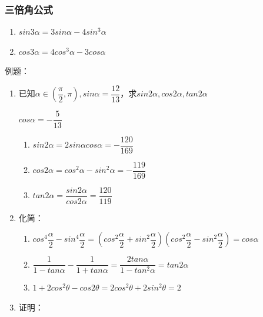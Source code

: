 \subsubsection*{三倍角公式}
\begin{enumerate}
    \item $sin3\alpha = 3sin\alpha - 4sin^3\alpha$
    \item $cos3\alpha = 4cos^3\alpha - 3cos\alpha$
\end{enumerate}
例题：
\begin{enumerate}
    \item 已知$\alpha \in (\dfrac{\pi}{2}, \pi), sin\alpha = \dfrac{12}{13}$，求$sin2\alpha, cos2\alpha, tan2\alpha$
    \begin{jieda}
        $cos\alpha = -\dfrac{5}{13}$
        \begin{enumerate}
            \item $sin2\alpha = 2sin\alpha cos\alpha = -\dfrac{120}{169}$
            \item $cos2\alpha = cos^2\alpha - sin^2\alpha = -\dfrac{119}{169}$
            \item $tan2\alpha = \dfrac{sin2\alpha}{cos2\alpha} = \dfrac{120}{119}$
        \end{enumerate}
    \end{jieda}
    \item 化简：
    \begin{jieda}
        \begin{enumerate}
            \item $cos^4\dfrac{\alpha}{2} - sin^4\dfrac{\alpha}{2} = \left(cos^2\dfrac{\alpha}{2} + sin^2\dfrac{\alpha}{2}\right) \left(cos^2\dfrac{\alpha}{2} - sin^2\dfrac{\alpha}{2}\right) = cos\alpha$
            \item $\dfrac{1}{1-tan\alpha} - \dfrac{1}{1+tan\alpha} = \dfrac{2tan\alpha}{1-tan^2\alpha} = tan2\alpha$
            \item $1+2cos^2\theta - cos2\theta = 2cos^2\theta + 2sin^2\theta = 2$
        \end{enumerate}
    \end{jieda}
    \item 证明：

\end{enumerate}
